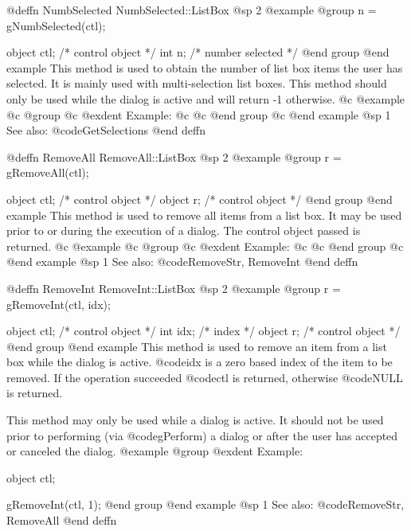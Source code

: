 {@deffn {NumbSelected} NumbSelected::ListBox
@sp 2
@example
@group
n = gNumbSelected(ctl);

object  ctl;    /*  control object   */
int     n;      /*  number selected  */
@end group
@end example
This method is used to obtain the number of list box items the user
has selected.  It is mainly used with multi-selection list boxes.
This method should only be used while the dialog is active and
will return -1 otherwise.
@c @example
@c @group
@c @exdent Example:
@c 
@c @end group
@c @end example
@sp 1
See also:  @code{GetSelections}
@end deffn














@deffn {RemoveAll} RemoveAll::ListBox
@sp 2
@example
@group
r = gRemoveAll(ctl);

object  ctl;    /*  control object  */
object  r;      /*  control object  */
@end group
@end example
This method is used to remove all items from a list box.  It may be used
prior to or during the execution of a dialog.  The control object passed
is returned.
@c @example
@c @group
@c @exdent Example:
@c 
@c @end group
@c @end example
@sp 1
See also:  @code{RemoveStr, RemoveInt}
@end deffn
















@deffn {RemoveInt} RemoveInt::ListBox
@sp 2
@example
@group
r = gRemoveInt(ctl, idx);

object  ctl;    /*  control object  */
int     idx;    /*  index           */
object  r;      /*  control object  */
@end group
@end example
This method is used to remove an item from a list box while the dialog
is active.  @code{idx} is a zero based index of the item to be removed.
If the operation succeeded @code{ctl} is returned, otherwise @code{NULL}
is returned.

This method may only be used while a dialog is active.  It should not be
used prior to performing (via @code{gPerform}) a dialog or after the user
has accepted or canceled the dialog.
@example
@group
@exdent Example:

object  ctl;

gRemoveInt(ctl, 1);
@end group
@end example
@sp 1
See also:  @code{RemoveStr, RemoveAll}
@end deffn














}
